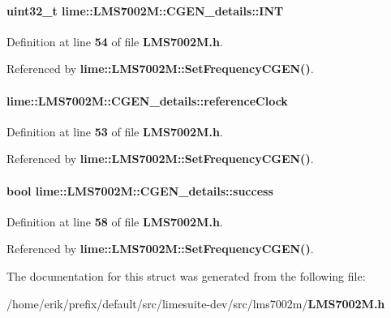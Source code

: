 \paragraph[{I\+NT}]{\setlength{\rightskip}{0pt plus 5cm}uint32\+\_\+t lime\+::\+L\+M\+S7002\+M\+::\+C\+G\+E\+N\+\_\+details\+::\+I\+NT}\label{structlime_1_1LMS7002M_1_1CGEN__details_a234db1568e2eaff038cd02eb162c611b}


Definition at line {\bf 54} of file {\bf L\+M\+S7002\+M.\+h}.



Referenced by {\bf lime\+::\+L\+M\+S7002\+M\+::\+Set\+Frequency\+C\+G\+E\+N()}.

\paragraph[{reference\+Clock}]{ lime\+::\+L\+M\+S7002\+M\+::\+C\+G\+E\+N\+\_\+details\+::reference\+Clock}\label{structlime_1_1LMS7002M_1_1CGEN__details_af46fcd02104e78c784cbcc6df5e3d46c}


Definition at line {\bf 53} of file {\bf L\+M\+S7002\+M.\+h}.



Referenced by {\bf lime\+::\+L\+M\+S7002\+M\+::\+Set\+Frequency\+C\+G\+E\+N()}.

\paragraph[{success}]{\setlength{\rightskip}{0pt plus 5cm}bool lime\+::\+L\+M\+S7002\+M\+::\+C\+G\+E\+N\+\_\+details\+::success}\label{structlime_1_1LMS7002M_1_1CGEN__details_aad35d93961b25648ddfd6f681d963d06}


Definition at line {\bf 58} of file {\bf L\+M\+S7002\+M.\+h}.



Referenced by {\bf lime\+::\+L\+M\+S7002\+M\+::\+Set\+Frequency\+C\+G\+E\+N()}.



The documentation for this struct was generated from the following file\+:\begin{DoxyCompactItemize}
\item 
/home/erik/prefix/default/src/limesuite-\/dev/src/lms7002m/{\bf L\+M\+S7002\+M.\+h}\end{DoxyCompactItemize}
